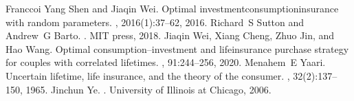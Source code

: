 \documentclass[letterpaper,10pt,english]{jupyterBook}
\begin{document}
\begin{sphinxthebibliography}{Franccoi}
\sphinxAtStartPar
Yang Shen and Jiaqin Wei. Optimal investment\sphinxhyphen{}consumption\sphinxhyphen{}insurance with random parameters. , 2016(1):37–62, 2016.
\sphinxAtStartPar
Richard S Sutton and Andrew G Barto. . MIT press, 2018.
\sphinxAtStartPar
Jiaqin Wei, Xiang Cheng, Zhuo Jin, and Hao Wang. Optimal consumption–investment and life\sphinxhyphen{}insurance purchase strategy for couples with correlated lifetimes. , 91:244–256, 2020.
\sphinxAtStartPar
Menahem E Yaari. Uncertain lifetime, life insurance, and the theory of the consumer. , 32(2):137–150, 1965.
\sphinxAtStartPar
Jinchun Ye. . University of Illinois at Chicago, 2006.
\end{sphinxthebibliography}







\renewcommand{\indexname}{Index}
\printindex
\end{document}
